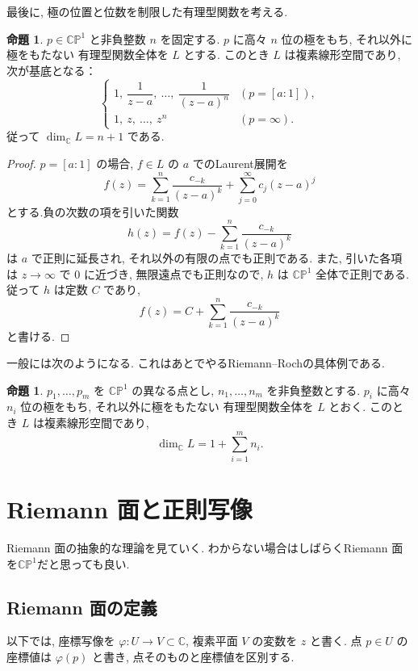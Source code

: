 \documentclass[dvipdfmx,a4paper,11pt]{article} %
\newcommand{\C}{\mathbb{C}}
\theoremstyle{definition}
\numberwithin{equation}{section}
\newtheorem{prop}[thm]{命題}
\begin{document}
最後に, 極の位置と位数を制限した有理型関数を考える.


\begin{prop}
\label{prop-RR-projective}
$p\in\C\mathbb P^1$ と非負整数 $n$ を固定する.
$p$ に高々 $n$ 位の極をもち, それ以外に極をもたない
有理型関数全体を $L$ とする.
このとき $L$ は複素線形空間であり, 次が基底となる：
\[
\begin{cases}
1,\ \dfrac1{z-a},\ \ldots,\ \dfrac1{(z-a)^n}
& (p=[a:1]),\\[6pt]
1,\ z,\ \ldots,\ z^n
& (p=\infty).
\end{cases}
\]
従って $\dim_{\C}L=n+1$ である.
\end{prop}

\begin{proof}
$p=[a:1]$ の場合, $f\in L$ の $a$ でのLaurent展開を
\[
f(z)=\sum_{k=1}^{n}\frac{c_{-k}}{(z-a)^k}
     +\sum_{j=0}^{\infty}c_j(z-a)^j
\]
とする.負の次数の項を引いた関数
\[
h(z)=f(z)-\sum_{k=1}^{n}\frac{c_{-k}}{(z-a)^k}
\]
は $a$ で正則に延長され, それ以外の有限の点でも正則である.
また, 引いた各項は $z\to\infty$ で $0$ に近づき, 
無限遠点でも正則なので, $h$ は $\C\mathbb P^1$ 全体で正則である.
従って $h$ は定数 $C$ であり, 
\[
f(z)=C+\sum_{k=1}^{n}\frac{c_{-k}}{(z-a)^k}
\]
と書ける.
\end{proof}


一般には次のようになる. これはあとでやるRiemann--Rochの具体例である.
\begin{prop}
$p_1,\ldots,p_m$ を $\C\mathbb P^1$ の異なる点とし, 
$n_1,\ldots,n_m$ を非負整数とする.
$p_i$ に高々 $n_i$ 位の極をもち, それ以外に極をもたない
有理型関数全体を $L$ とおく.
このとき $L$ は複素線形空間であり, 
\[
\dim_{\C}L=1+\sum_{i=1}^{m}n_i.
\]
\end{prop}

\newpage

\section{Riemann 面と正則写像}\label{O-S013}
Riemann 面の抽象的な理論を見ていく. わからない場合はしばらくRiemann 面を$\C\mathbb P^1$だと思っても良い. 

\subsection{Riemann 面の定義}\label{O-S014}

以下では, 座標写像を $\varphi:U\to V\subset\C$,
複素平面 $V$ の変数を $z$ と書く.
点 $p\in U$ の座標値は $\varphi(p)$ と書き,
点そのものと座標値を区別する.
\end{document}
